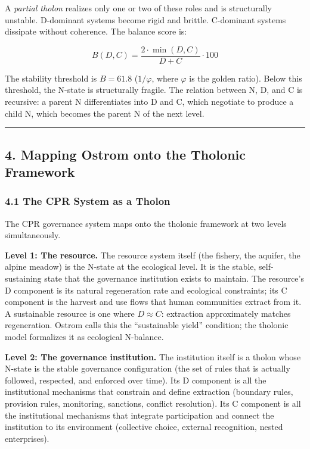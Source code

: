 \documentclass[
  11pt,
  letterpaper,
]{article}
\begin{document}
A \emph{partial tholon} realizes only one or two of these roles and is
structurally unstable. D-dominant systems become rigid and brittle.
C-dominant systems dissipate without coherence. The balance score is:

\[B(D,C) = \frac{2 \cdot \min(D,C)}{D + C} \cdot 100\]

The stability threshold is \(B = 61.8\) (\(1/\varphi\), where
\(\varphi\) is the golden ratio). Below this threshold, the N-state is
structurally fragile. The relation between N, D, and C is recursive: a
parent N differentiates into D and C, which negotiate to produce a child
N, which becomes the parent N of the next level.

\begin{center}\rule{0.5\linewidth}{0.5pt}\end{center}

\subsection{4. Mapping Ostrom onto the Tholonic
Framework}\label{mapping-ostrom-onto-the-tholonic-framework}

\subsubsection{4.1 The CPR System as a
Tholon}\label{the-cpr-system-as-a-tholon}

The CPR governance system maps onto the tholonic framework at two levels
simultaneously.

\textbf{Level 1: The resource.} The resource system itself (the fishery,
the aquifer, the alpine meadow) is the N-state at the ecological level.
It is the stable, self-sustaining state that the governance institution
exists to maintain. The resource's D component is its natural
regeneration rate and ecological constraints; its C component is the
harvest and use flows that human communities extract from it. A
sustainable resource is one where \(D \approx C\): extraction
approximately matches regeneration. Ostrom calls this the ``sustainable
yield'' condition; the tholonic model formalizes it as ecological
N-balance.

\textbf{Level 2: The governance institution.} The institution itself is
a tholon whose N-state is the stable governance configuration (the set
of rules that is actually followed, respected, and enforced over time).
Its D component is all the institutional mechanisms that constrain and
define extraction (boundary rules, provision rules, monitoring,
sanctions, conflict resolution). Its C component is all the
institutional mechanisms that integrate participation and connect the
institution to its environment (collective choice, external recognition,
nested enterprises).
\end{document}
